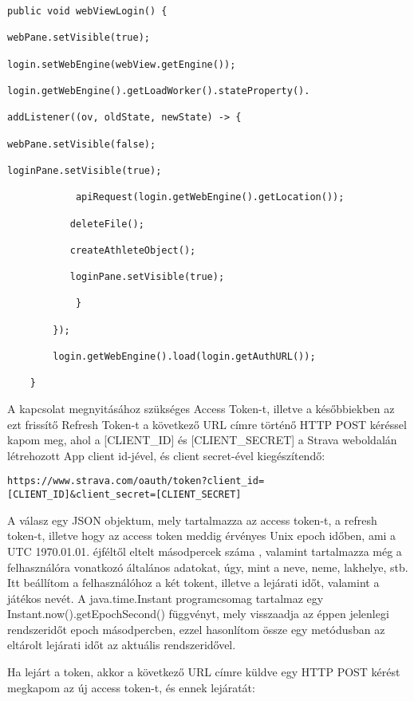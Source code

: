 \begin{verbatim}
public void webViewLogin() { 

webPane.setVisible(true); 

login.setWebEngine(webView.getEngine()); 

login.getWebEngine().getLoadWorker().stateProperty(). 

addListener((ov, oldState, newState) -> { 

webPane.setVisible(false); 

loginPane.setVisible(true); 

          	apiRequest(login.getWebEngine().getLocation()); 

           deleteFile(); 

           createAthleteObject(); 

           loginPane.setVisible(true); 

            } 

        }); 

        login.getWebEngine().load(login.getAuthURL()); 

    } 
\end{verbatim}
 

A kapcsolat megnyitásához szükséges Access Token-t, illetve a későbbiekben az ezt frissítő Refresh Token-t a következő URL címre történő HTTP POST kéréssel kapom meg, ahol a [CLIENT\_ID] és [CLIENT\_SECRET] a Strava weboldalán létrehozott App client id-jével, és client secret-ével kiegészítendő:

\begin{verbatim}
https://www.strava.com/oauth/token?client_id=[CLIENT_ID]&client_secret=[CLIENT_SECRET] 
\end{verbatim}

A válasz egy JSON objektum, mely tartalmazza az access token-t, a refresh token-t, illetve hogy az access token meddig érvényes Unix epoch időben, ami a UTC 1970.01.01. éjféltől eltelt másodpercek száma , valamint tartalmazza még a felhasználóra vonatkozó általános adatokat, úgy, mint a neve, neme, lakhelye, stb. Itt beállítom a felhasználóhoz a két tokent, illetve a lejárati időt, valamint a játékos nevét. A java.time.Instant programcsomag tartalmaz egy Instant.now().getEpochSecond() függvényt, mely visszaadja az éppen jelenlegi rendszeridőt epoch másodpercben, ezzel hasonlítom össze egy metódusban az eltárolt lejárati időt az aktuális rendszeridővel. 

Ha lejárt a token, akkor a következő URL címre küldve egy HTTP POST kérést megkapom az új access token-t, és ennek lejáratát:

